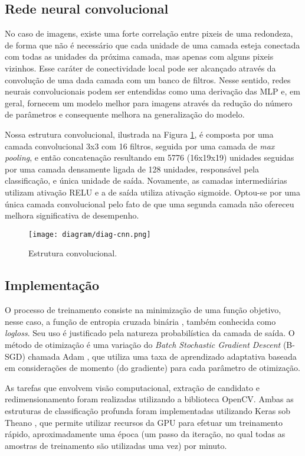     \subsection{Rede neural convolucional}
         No caso de imagens, existe uma forte correlação entre pixeis de uma redondeza, de forma que não é necessário que cada unidade de uma camada esteja conectada com todas as unidades da próxima camada, mas apenas com alguns pixeis vizinhos. Esse caráter de conectividade local pode ser alcançado através da convolução de uma dada camada com um banco de filtros. Nesse sentido, redes neurais convolucionais podem ser entendidas como uma derivação das MLP e, em geral, fornecem um modelo melhor para imagens através da redução do número de parâmetros e consequente melhora na generalização do modelo.

         Nossa estrutura convolucional, ilustrada na Figura \ref{fig:diag-cnn}, é composta por uma camada convolucional 3x3 com 16 filtros, seguida por uma camada de \textit{max pooling}, e então concatenação resultando em 5776 (16x19x19) unidades seguidas por uma camada densamente ligada de 128 unidades, responsável pela classificação, e única unidade de saída. Novamente, as camadas intermediárias utilizam ativação RELU e a de saída utiliza ativação sigmoide. Optou-se por uma única camada convolucional pelo fato de que uma segunda camada não ofereceu melhora significativa de desempenho.

        \begin{figure}
        \centering
        \texttt{[image: diagram/diag-cnn.png]}
        \caption{Estrutura convolucional.}
        \label{fig:diag-cnn}
        \end{figure}

    \subsection{Implementação}
        O processo de treinamento consiste na minimização de uma função objetivo, nesse caso, a função de entropia cruzada binária \cite{DLbook}, também conhecida como \textit{logloss}. Seu uso é justificado pela natureza probabilística da camada de saída. O método de otimização é uma variação do \textit{Batch Stochastic Gradient Descent} (B-SGD) chamada Adam \cite{kingma2014adam}, que utiliza uma taxa de aprendizado adaptativa baseada em considerações de momento (do gradiente) para cada parâmetro de otimização.

        As tarefas que envolvem visão computacional, extração de candidato e redimensionamento foram realizadas utilizando a biblioteca OpenCV. Ambas as estruturas de classificação profunda foram implementadas utilizando Keras \cite{keras} sob Theano \cite{theano}, que permite utilizar recursos da GPU para efetuar um treinamento rápido, aproximadamente uma época (um passo da iteração, no qual todas as amostras de treinamento são utilizadas uma vez) por minuto.

